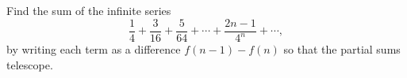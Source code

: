 Find the sum of the infinite series
\[
\dfrac{1}{4}+\dfrac{3}{16}+\dfrac{5}{64}+\cdots+\dfrac{2n-1}{4^n}+\cdots ,
\]
by writing each term as a difference $f(n-1)-f(n)$ so that the partial sums telescope.
